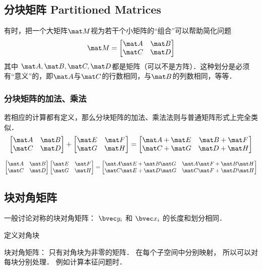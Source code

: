 
\begin{issues}
\issueDraft
\end{issues}

\subsection{分块矩阵 Partitioned Matrices}
有时，把一个大矩阵$\mat M$视为若干个小矩阵的“组合”可以帮助简化问题
\begin{equation}
\mat M = 
\begin{bmatrix}
\mat A & \mat B\\
\mat C & \mat D\\
\end{bmatrix}
\end{equation}
其中 $\mat A, \mat B, \mat C, \mat D$都是矩阵（可以不是方阵）．这种划分是必须有“意义”的，即$\mat A$与$\mat C$的行数相同，与$\mat B$的列数相同，等等．

\subsubsection{分块矩阵的加法、乘法}
若相应的计算都有定义，那么分块矩阵的加法、乘法法则与普通矩阵形式上完全类似．
\begin{equation}
\begin{bmatrix}
\mat A & \mat B\\
\mat C & \mat D\\
\end{bmatrix}
+
\begin{bmatrix}
\mat E & \mat F\\
\mat G & \mat H\\
\end{bmatrix}
=
\begin{bmatrix}
\mat A +\mat E & \mat B +\mat F\\
\mat C +\mat G & \mat D +\mat H\\
\end{bmatrix}
\end{equation}

\begin{equation}
\begin{bmatrix}
\mat A & \mat B\\
\mat C & \mat D\\
\end{bmatrix}
\begin{bmatrix}
\mat E & \mat F\\
\mat G & \mat H\\
\end{bmatrix}
=
\begin{bmatrix}
\mat A \mat E +\mat B \mat G & \mat A \mat F +\mat B \mat H \\
\mat C \mat E +\mat D \mat G  & \mat C \mat F +\mat D \mat H \\
\end{bmatrix}
\end{equation}


\subsection{块对角矩阵}
一般讨论对称的块对角矩阵： $\bvec y_i$ 和 $\bvec x_i$ 的长度和划分相同．

定义对角块

块对角矩阵： 只有对角块为非零的矩阵． 在每个子空间中分别映射， 所以可以对每块分别处理． 例如计算本征问题时．
